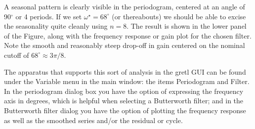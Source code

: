 A seasonal pattern is clearly visible in the periodogram, centered at
an angle of 90$^{\circ}$ or 4 periods. If we set $\omega^{\star} =
68^{\circ}$ (or thereabouts) we should be able to excise the
seasonality quite cleanly using $n=8$.  The result is shown in the
lower panel of the Figure, along with the frequency response or gain
plot for the chosen filter. Note the smooth and reasonably steep
drop-off in gain centered on the nominal cutoff of $68^{\circ} \approx
3\pi/8$.

The apparatus that supports this sort of analysis in the gretl
GUI can be found under the \textsf{Variable} menu in the main window:
the items \textsf{Periodogram} and \textsf{Filter}. In the periodogram
dialog box you have the option of expressing the frequency axis in
degrees, which is helpful when selecting a Butterworth filter; and in
the Butterworth filter dialog you have the option of plotting the
frequency response as well as the smoothed series and/or the residual
or cycle.

